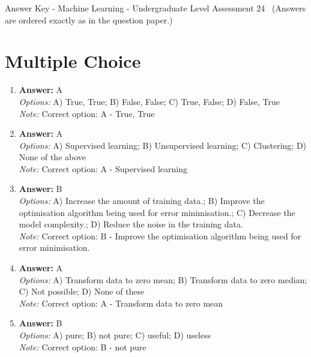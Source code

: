 \documentclass[12pt]{article}
\begin{document}
\begin{center}
Answer Key - Machine Learning - Undergraduate Level Assessment 24 \
\small (Answers are ordered exactly as in the question paper.)
\end{center}

\section*{Multiple Choice}
\begin{enumerate}[label=\arabic*.]
\item \textbf{Answer:} A
\\ \textit{Options:} A) True, True; B) False, False; C) True, False; D) False, True
\\ \textit{Note:} Correct option: A - True, True
\item \textbf{Answer:} A
\\ \textit{Options:} A) Supervised learning; B) Unsupervised learning; C) Clustering; D) None of the above
\\ \textit{Note:} Correct option: A - Supervised learning
\item \textbf{Answer:} B
\\ \textit{Options:} A) Increase the amount of training data.; B) Improve the optimisation algorithm being used for error minimisation.; C) Decrease the model complexity.; D) Reduce the noise in the training data.
\\ \textit{Note:} Correct option: B - Improve the optimisation algorithm being used for error minimisation.
\item \textbf{Answer:} A
\\ \textit{Options:} A) Transform data to zero mean; B) Transform data to zero median; C) Not possible; D) None of these
\\ \textit{Note:} Correct option: A - Transform data to zero mean
\item \textbf{Answer:} B
\\ \textit{Options:} A) pure; B) not pure; C) useful; D) useless
\\ \textit{Note:} Correct option: B - not pure
\end{enumerate}
\end{document}
